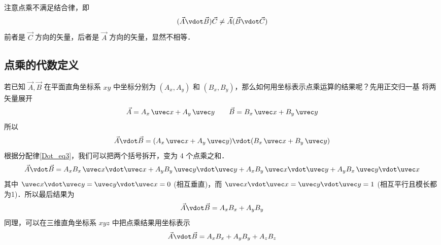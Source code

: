 注意点乘不满足结合律，即
\begin{equation}
(\vec A \vdot \vec B) \vec C \ne  \vec A (\vec B \vdot \vec C)
\end{equation}
前者是 $\vec C$ 方向的矢量，后者是 $\vec A$ 方向的矢量，显然不相等．

\subsection{点乘的代数定义}
若已知 $\vec A, \vec B$ 在平面直角坐标系 $xy$ 中坐标分别为 $(A_x,A_y)$ 和  $(B_x,B_y)$，那么如何用坐标表示点乘运算的结果呢？先用正交归一基 将两矢量展开 %
\begin{equation}
\vec A = A_x \,\uvec x + A_y \,\uvec y \qquad \vec B = B_x \,\uvec x + B_y \,\uvec y
\end{equation}
所以
\begin{equation}
\vec A \vdot \vec B = (A_x \,\uvec x + A_y \,\uvec y) \vdot (B_x \,\uvec x + B_y \,\uvec y)
\end{equation}
根据分配律\autoref{Dot_eq3}，我们可以把两个括号拆开，变为 4 个点乘之和． 
\begin{equation}
\vec A \vdot \vec B = A_x B_x \,\uvec x \vdot \uvec x + A_y B_y \,\uvec y \vdot \uvec y + A_x B_y \,\uvec x \vdot \uvec y + A_y B_x \,\uvec y \vdot \uvec x
\end{equation}
其中 $\uvec x \vdot \uvec y = \uvec y \vdot \uvec x = 0$ (相互垂直)，而 $\uvec x \vdot \uvec x = \uvec y \vdot \uvec y = 1$ (相互平行且模长都为1)．所以最后结果为
\begin{equation}
\vec A \vdot \vec B = A_x B_x + A_y B_y
\end{equation}
同理，可以在三维直角坐标系 $xyz$ 中把点乘结果用坐标表示
\begin{equation}
\vec A \vdot \vec B = A_x B_x + A_y B_y + A_z B_z	
\end{equation}

